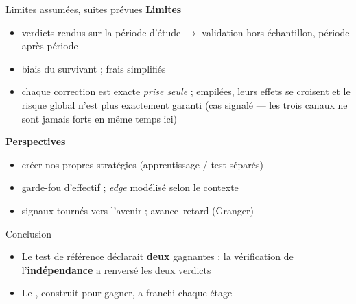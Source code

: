 \documentclass[10pt]{beamer}
\newcommand{\edge}{\textit{edge}}
\begin{document}
\begin{frame}{Limites assumées, suites prévues}
  \textbf{Limites}
  \begin{itemize}\setlength{\itemsep}{2mm}
    \item verdicts rendus sur la période d'étude $\to$ validation hors
      échantillon, période après période
    \item biais du survivant ; frais simplifiés
    \item chaque correction est exacte \emph{prise seule} ; empilées, leurs
      effets se croisent et le risque global n'est plus exactement garanti
      {\footnotesize (cas signalé --- les trois canaux ne sont jamais forts
      en même temps ici)}
  \end{itemize}
  \vspace{5mm}
  \textbf{Perspectives}
  \begin{itemize}\setlength{\itemsep}{2mm}
    \item créer nos propres stratégies (apprentissage / test séparés)
    \item garde-fou d'effectif ; \edge{} modélisé selon le contexte
    \item signaux tournés vers l'avenir ; avance--retard (Granger)
  \end{itemize}
\end{frame}

\begin{frame}{Conclusion}
  \vspace{2mm}
  \begin{itemize}\setlength{\itemsep}{5mm}
    \item Le test de référence déclarait \textbf{deux} gagnantes ; la
      vérification de l'\textbf{indépendance} a renversé les deux verdicts
    \item Le , construit pour gagner, a franchi chaque étage
  \end{itemize}
  \vspace{8mm}
  \begin{center}
  \end{center}
\end{frame}
\end{document}
